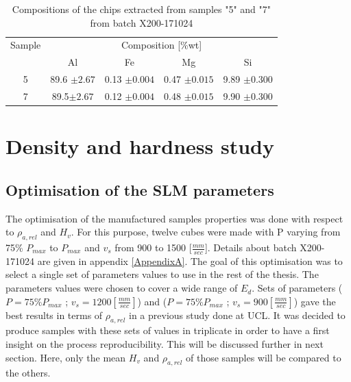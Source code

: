  \begin{center}
\begin{table}[ht]
\centering
\begin{tabular}{|c|c|c |c |c| }
    \hline
    Sample& \multicolumn{4}{c}{Composition [\%wt]} \vline\\
    \cline{2-5}
    & Al& Fe&Mg&Si\\
\hline 
\hline   
    5 & 89.6 $\pm 2.67$&0.13 $\pm 0.004$& 0.47 $\pm 0.015$ &9.89 $\pm 0.300$\\
        7 & 89.5$\pm 2.67$&0.12 $\pm 0.004$& 0.48 $\pm 0.015$ &9.90 $\pm 0.300$\\
    \hline
\end{tabular}

\caption[Compositions of the chips extracted from samples "5" and "7" from batch X200-171024]{Compositions of the chips extracted from samples "5" and "7" from batch X200-171024}
\label{tab:chip}
\end{table}
 \end{center}



\section{Density and hardness study}
\subsection{Optimisation of the SLM parameters}
\label{Rparaopti}
The optimisation of the manufactured samples properties was done with respect to $\rho_{a,rel}$ and $H_v$. For this purpose, twelve cubes were made with P varying from 75\% $P_{max} $ to $P_{max}$ and $v_s$ from 900 to 1500 [$\frac{mm}{sec}$]. Details about batch X200-171024 are given in appendix \ref{AppendixA}. The goal of this optimisation was to select a single set of parameters values to use in the rest of the thesis. The parameters values were chosen to cover a wide range of $E_d$. Sets of parameters ($P=75\% P_{max}$ ; $v_s=1200 [\frac{mm}{sec}]$) and ($P=75\% P_{max}$ ; $v_s=900 [\frac{mm}{sec}]$) gave the best results in terms of $\rho_{a,rel}$ in a previous study done at UCL. It was decided to produce samples with these sets of values in triplicate in order to have a first insight on the process reproducibility. This will be discussed further in next section. Here, only the mean $H_v$ and $\rho_{a,rel}$ of those samples will be compared to the others.\\

